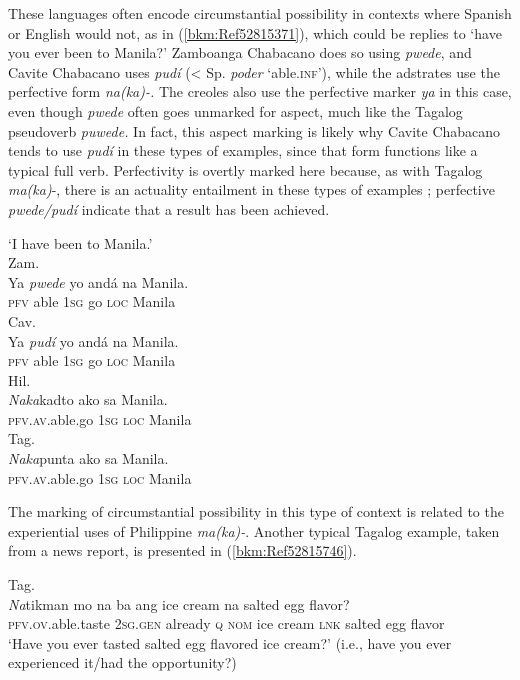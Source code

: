 \documentclass[output=paper,colorlinks,citecolor=brown]{langscibook}
\begin{document}
These languages often encode circumstantial possibility in contexts where Spanish or English would not, as in (\ref{bkm:Ref52815371}), which could be replies to ‘have you ever been to Manila?’ Zamboanga Chabacano does so using \textit{pwede}, and Cavite Chabacano uses \textit{pudí} (< Sp. \textit{poder} ‘able.\textsc{inf}’), while the adstrates use the perfective form \textit{na(ka)-.} The creoles also use the perfective marker \textit{ya} in this case, even though \textit{pwede} often goes unmarked for aspect, much like the Tagalog pseudoverb \textit{puwede.} In fact, this aspect marking is likely why Cavite Chabacano tends to use \textit{pudí} in these types of examples, since that form functions like a typical full verb. Perfectivity is overtly marked here because, as with Tagalog \textit{ma(ka)}{}-, there is an actuality entailment in these types of examples \citep{Dell1983}; perfective \textit{pwede/pudí} indicate that a result has been achieved.

\ea
{\label{bkm:Ref52815371}‘I have been to Manila.’}\\
\ea
{Zam.}\\
\gll Ya \textit{pwede} yo andá na Manila.\\
     \textsc{pfv} able \textsc{1sg} go \textsc{loc} Manila\\
\ex
{Cav.}\\
\gll  Ya \textit{pudí} yo andá na Manila. \\
     \textsc{pfv} able \textsc{1sg} go \textsc{loc} Manila\\
\ex
{Hil.}\\
\gll     \textit{Naka}kadto               ako          sa           Manila.\\
     \textsc{pfv}.\textsc{av}.able.go \textsc{1sg} \textsc{loc} Manila\\
\ex
{Tag.}\\
\gll \textit{Naka}punta ako sa Manila.\\
     \textsc{pfv}.\textsc{av}.able.go \textsc{1sg} \textsc{loc} Manila\\
\z
\z

The marking of circumstantial possibility in this type of context is related to the experiential uses of Philippine \textit{ma(ka)-}. Another typical Tagalog example, taken from a news report, is presented in (\ref{bkm:Ref52815746}).

\ea
\label{bkm:Ref52815746}Tag.\\
\gll \textit{Na}tikman mo na ba ang ice cream na salted egg flavor?\\
\textsc{pfv.ov}.able.taste 2\textsc{sg.gen} already \textsc{q} \textsc{nom} ice cream \textsc{lnk} salted egg flavor\\
\glt `Have you ever tasted salted egg flavored ice cream?' (i.e., have you ever experienced it/had the opportunity?) \citep{Santos2018}
\z
\end{document}
